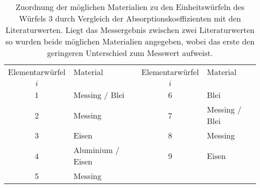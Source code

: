 \begin{table}[!h]
	\centering
	\begin{tabular}{clcl}
		\toprule
		Elementarwürfel & Material & Elementarwürfel & Material\\
		$i$ & & $i$ & \\
\midrule
		\num{1} & Messing / Blei & \num{6}& Blei\\
		\num{2} & Messing & \num{7}& Messing / Blei \\
		\num{3} & Eisen  & \num{8}& Messing\\
		\num{4} & Aluminium / Eisen   & \num{9}& Eisen\\
		\num{5} & Messing & &       \\
		
		\bottomrule
	\end{tabular}
	\caption{Zuordnung der möglichen Materialien zu den Einheitswürfeln des Würfels 3
		durch Vergleich der Absorptionskoeffizienten mit den Literaturwerten. Liegt das Messergebnis 
		zwischen zwei Literaturwerten so wurden beide möglichen Materialien angegeben, wobei das erste den
		geringeren Unterschied zum Messwert aufweist. \label{tab:Materialien_Block3}}
\end{table}
